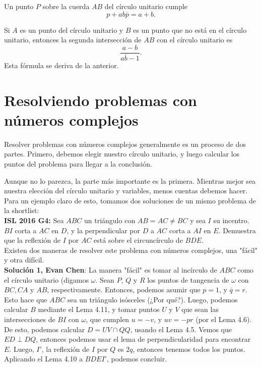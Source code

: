 \documentclass[11pt]{scrartcl}
\begin{document}
\begin{lemma}
    Un punto $P$ sobre la cuerda $AB$ del círculo unitario cumple 
    \[p+ab\overline p = a+b.\]
\end{lemma}

\begin{lemma}
    Si $A$ es un punto del círculo unitario y $B$ es un punto que no está en el círculo unitario, entonces la segunda intersección de $AB$ con el círculo unitario es 
    \[\frac{a-b}{a\overline b-1}.\]
    Esta fórmula se deriva de la anterior.
\end{lemma}

\section{Resolviendo problemas con números complejos}

Resolver problemas con números complejos generalmente es un proceso de dos partes. Primero, debemos elegir nuestro círculo unitario, y luego calcular los puntos del problema para llegar a la conclusión. 

Aunque no lo parezca, la parte más importante es la primera. Mientras mejor sea nuestra elección del círculo unitario y variables, menos cuentas debemos hacer. Para un ejemplo claro de esto, tomamos dos soluciones de un mismo problema de la shortlist:\\

\textbf{ISL 2016 G4:} Sea $ABC$ un triángulo con $AB=AC\neq BC$ y sea $I$ su incentro. $BI$ corta a $AC$ en $D$, y la perpendicular por $D$ a $AC$ corta a $AI$ en $E$. Demuestra que la reflexión de $I$ por $AC$ está sobre el circuncírculo de $BDE$.\\

Existen dos maneras de resolver este problema con números complejos, una "fácil" y otra difícil. \\

\textbf{Solución 1, Evan Chen}: La manera "fácil" es tomar al incírculo de $ABC$ como el círculo unitario (digamos $\omega$. Sean $P$, $Q$ y $R$ los puntos de tangencia de $\omega$ con $BC, CA$ y $AB$, respectivamente. Entonces, podemos asumir que $p = 1$, y $\overline q = r$. Esto hace que $ABC$ sea un triángulo isósceles (¿Por qué?). Luego, podemos calcular $B$ mediante el Lema 4.11, y tomar puntos $U$ y $V$ que sean las intersecciones de $BI$ con $\omega$, que cumplen $u = -v$, y $uv = -pr$ (por el Lema 4.6). De esto, podemos calcular $D = UV\cap QQ$, usando el Lema 4.5. Vemos que $ED \perp DQ$, entonces podemos usar el lema de perpendicularidad para encontrar $E$. Luego, $I'$, la reflexión de $I$ por $Q$ es $2q$, entonces tenemos todos los puntos. Aplicando el Lema 4.10 a $BDEI'$, podemos concluir. 
\end{document}
